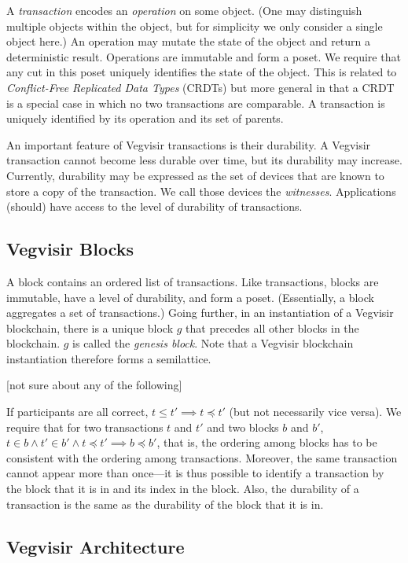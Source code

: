 \documentclass{article}
\begin{document}
A \emph{transaction} encodes an \emph{operation} on some object.
(One may distinguish multiple objects within the object, but for simplicity
we only consider a single object here.)
An operation may mutate the state of the object and return a deterministic
result.
Operations are immutable and form a poset.
We require that any cut in this poset
uniquely identifies the state of the object.  This is related to
\emph{Conflict-Free Replicated Data Types} (CRDTs) but more general
in that a CRDT is a special case in which no two transactions are comparable.
A transaction is uniquely identified by its operation and its set of parents.

An important feature of Vegvisir transactions is their durability.
A Vegvisir transaction cannot become less durable over time, but its
durability may increase.  Currently, durability may be expressed as the
set of devices that are known to store a copy of the transaction.  We
call those devices the \emph{witnesses}.
Applications (should) have access to the level of durability of
transactions.

\subsection{Vegvisir Blocks}

A block contains an ordered list of transactions.
Like transactions, blocks are immutable, have a level of durability,
and form a poset.
(Essentially, a block aggregates a set of transactions.)
Going further, in an instantiation of a Vegvisir blockchain,
there is a unique block $g$ that precedes all other blocks in the blockchain.
$g$ is called the \emph{genesis block}.  Note that a Vegvisir blockchain
instantiation therefore forms a semilattice.

[not sure about any of the following]

If participants are all correct, $t \leq t' \implies t \preceq t'$
(but not necessarily vice versa).
We require that for two transactions $t$ and $t'$ and two blocks $b$ and
$b'$, $t \in b \wedge t' \in b' \wedge t \preceq t' \implies b \preceq b'$,
that is, the ordering among blocks has to be consistent with the ordering
among transactions.  Moreover, the same transaction cannot appear more
than once---it is thus possible to identify a transaction by the block
that it is in and its index in the block.
Also, the durability of a
transaction is the same as the durability of the block that it is in.

\subsection{Vegvisir Architecture}
\end{document}
